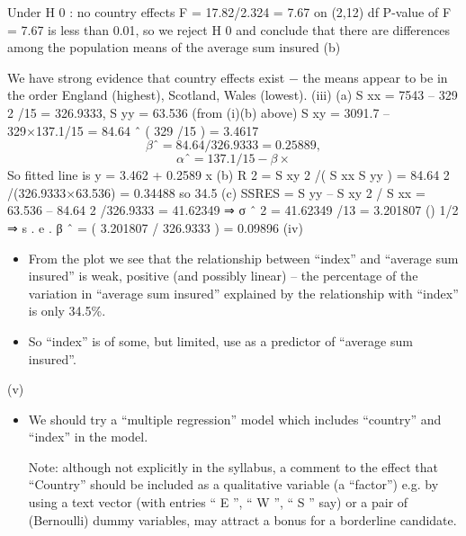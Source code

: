 \documentclass[a4paper,12pt]{article}
\begin{document}
Under H 0 : no country effects F = 17.82/2.324 = 7.67 on (2,12) df
P-value of F = 7.67 is less than 0.01, so we reject H 0 and conclude that there are differences among the population means of the average sum
insured
(b)

We have strong evidence that country effects exist − the means appear to be in the order England (highest), Scotland, Wales (lowest).
(iii)
(a)
S xx = 7543 – 329 2 /15 = 326.9333, S yy = 63.536 (from (i)(b) above)
S xy = 3091.7 – 329×137.1/15 = 84.64
ˆ ( 329 /15 ) = 3.4617
\[β ˆ = 84.64 / 326.9333 = 0.25889 ,\] 
\[α ˆ = 137.1/15 − β×\]
So fitted line is y = 3.462 + 0.2589 x
(b) R 2 = S xy 2 /( S xx S yy ) = 84.64 2 /(326.9333×63.536) = 0.34488 so 34.5%
(c) SSRES = S yy – S xy 2 / S xx = 63.536 – 84.64 2 /326.9333 = 41.62349
⇒ σ ˆ 2 = 41.62349 /13 = 3.201807
()
1/2
⇒ s . e . β ˆ = ( 3.201807 / 326.9333 ) = 0.09896
(iv)
\begin{itemize}
\item From the plot we see that the relationship between “index” and “average sum insured” is weak, positive (and possibly linear) – the percentage of the variation in “average sum insured” explained by the relationship with “index”
is only 34.5\%.
\item So “index” is of some, but limited, use as a predictor of “average sum
insured”.
\end{itemize}
(v)
\begin{itemize}
\item We should try a “multiple regression” model which includes “country” and
“index” in the model.
\item[ Note: although not explicitly in the syllabus, a comment to the effect that “Country” should be included as a qualitative variable (a “factor”) e.g. by using a text vector (with entries “ E ”, “ W ”, “ S ” say) or a pair of (Bernoulli)
dummy variables, may attract a bonus for a borderline candidate.]
\end{itemize}
\end{document}
